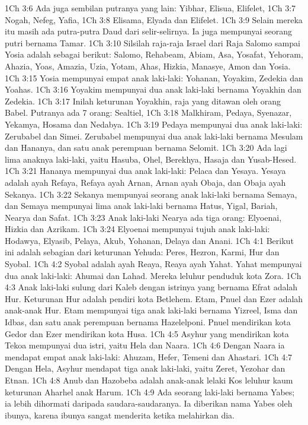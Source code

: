 1Ch 3:6  Ada juga sembilan putranya yang lain: Yibhar, Elisua, Elifelet,
1Ch 3:7  Nogah, Nefeg, Yafia,
1Ch 3:8  Elisama, Elyada dan Elifelet.
1Ch 3:9  Selain mereka itu masih ada putra-putra Daud dari selir-selirnya. Ia juga mempunyai seorang putri bernama Tamar.
1Ch 3:10  Silsilah raja-raja Israel dari Raja Salomo sampai Yosia adalah sebagai berikut: Salomo, Rehabeam, Abiam, Asa, Yosafat, Yehoram, Ahazia, Yoas, Amazia, Uzia, Yotam, Ahas, Hizkia, Manasye, Amon dan Yosia.
1Ch 3:15  Yosia mempunyai empat anak laki-laki: Yohanan, Yoyakim, Zedekia dan Yoahas.
1Ch 3:16  Yoyakim mempunyai dua anak laki-laki bernama Yoyakhin dan Zedekia.
1Ch 3:17  Inilah keturunan Yoyakhin, raja yang ditawan oleh orang Babel. Putranya ada 7 orang: Sealtiel,
1Ch 3:18  Malkhiram, Pedaya, Syenazar, Yekamya, Hosama dan Nedabya.
1Ch 3:19  Pedaya mempunyai dua anak laki-laki: Zerubabel dan Simei. Zerubabel mempunyai dua anak laki-laki bernama Mesulam dan Hananya, dan satu anak perempuan bernama Selomit.
1Ch 3:20  Ada lagi lima anaknya laki-laki, yaitu Hasuba, Ohel, Berekhya, Hasaja dan Yusab-Hesed.
1Ch 3:21  Hananya mempunyai dua anak laki-laki: Pelaca dan Yesaya. Yesaya adalah ayah Refaya, Refaya ayah Arnan, Arnan ayah Obaja, dan Obaja ayah Sekanya.
1Ch 3:22  Sekanya mempunyai seorang anak laki-laki bernama Semaya, dan Semaya mempunyai lima anak laki-laki bernama Hatus, Yigal, Bariah, Nearya dan Safat.
1Ch 3:23  Anak laki-laki Nearya ada tiga orang: Elyoenai, Hizkia dan Azrikam.
1Ch 3:24  Elyoenai mempunyai tujuh anak laki-laki: Hodawya, Elyasib, Pelaya, Akub, Yohanan, Delaya dan Anani.
1Ch 4:1  Berikut ini adalah sebagian dari keturunan Yehuda: Peres, Hezron, Karmi, Hur dan Syobal.
1Ch 4:2  Syobal adalah ayah Reaya, Reaya ayah Yahat. Yahat mempunyai dua anak laki-laki: Ahumai dan Lahad. Mereka leluhur penduduk kota Zora.
1Ch 4:3  Anak laki-laki sulung dari Kaleb dengan istrinya yang bernama Efrat adalah Hur. Keturunan Hur adalah pendiri kota Betlehem. Etam, Pnuel dan Ezer adalah anak-anak Hur. Etam mempunyai tiga anak laki-laki bernama Yizreel, Isma dan Idbas, dan satu anak perempuan bernama Hazelelponi. Pnuel mendirikan kota Gedor dan Ezer mendirikan kota Husa.
1Ch 4:5  Asyhur yang mendirikan kota Tekoa mempunyai dua istri, yaitu Hela dan Naara.
1Ch 4:6  Dengan Naara ia mendapat empat anak laki-laki: Ahuzam, Hefer, Temeni dan Ahastari.
1Ch 4:7  Dengan Hela, Asyhur mendapat tiga anak laki-laki, yaitu Zeret, Yezohar dan Etnan.
1Ch 4:8  Anub dan Hazobeba adalah anak-anak lelaki Kos leluhur kaum keturunan Aharhel anak Harum.
1Ch 4:9  Ada seorang laki-laki bernama Yabes; ia lebih dihormati daripada saudara-saudaranya. Ia diberikan nama Yabes oleh ibunya, karena ibunya sangat menderita ketika melahirkan dia.
